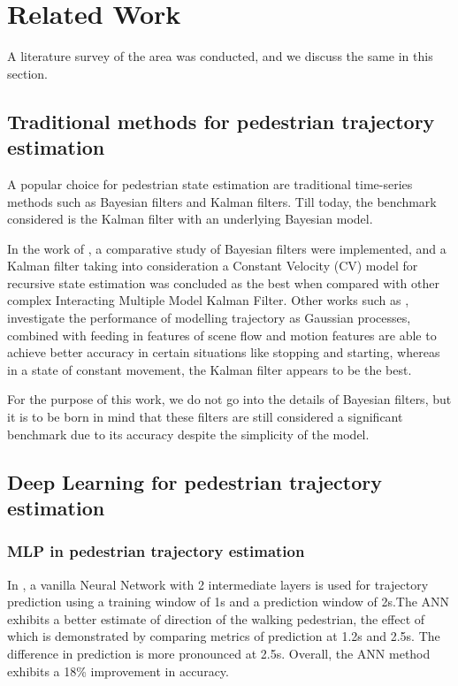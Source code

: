 \chapter{Related Work }

A literature survey of the area was conducted, and we discuss the same in this section.

\section{Traditional methods for pedestrian trajectory estimation}
A popular choice for pedestrian state estimation are traditional time-series methods such as Bayesian filters and Kalman filters. Till today, the benchmark considered is the Kalman filter with an underlying Bayesian model.

In the work of \cite{hutchison_pedestrian_2013}, a comparative study of Bayesian filters were implemented, and a Kalman filter taking into consideration a Constant Velocity (CV) model for recursive state estimation was concluded as the best when compared with other complex Interacting Multiple Model Kalman Filter. Other works such as \cite{keller_will_2014}, investigate the performance of modelling trajectory as Gaussian processes, combined with feeding in features of scene flow and motion features are able to achieve better accuracy in certain situations like stopping and starting, whereas in a state of constant movement, the Kalman filter appears to be the best. 

For the purpose of this work, we do not go into the details of Bayesian filters, but it is to be born in mind that these filters are still considered a significant benchmark due to its accuracy despite the simplicity of the model. 

\section{Deep Learning for pedestrian trajectory estimation}

\subsection{MLP in pedestrian trajectory estimation}
In \cite{goldhammer_pedestrians_2014}, a vanilla Neural Network with 2 intermediate layers is used for trajectory prediction using a training window of 1s and a prediction window of 2s.The ANN exhibits a better estimate of direction of the walking pedestrian, the effect of which is demonstrated by comparing metrics of prediction at 1.2s and 2.5s. 
The difference in prediction is more pronounced at 2.5s. Overall, the ANN method exhibits a 18\% improvement in accuracy. 

